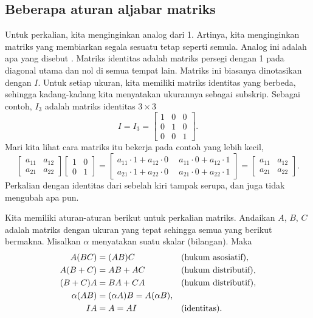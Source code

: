\subsection{Beberapa aturan aljabar matriks}

Untuk perkalian, kita menginginkan analog dari 1. Artinya,
kita menginginkan matriks yang membiarkan segala sesuatu tetap seperti semula.
Analog ini adalah apa yang disebut
\emph{}.
Matriks identitas adalah matriks persegi dengan 1 pada
diagonal utama dan nol di semua tempat lain. Matriks ini biasanya dinotasikan dengan $I$.
Untuk setiap ukuran, kita memiliki matriks identitas yang berbeda, sehingga kadang-kadang kita menyatakan
ukurannya sebagai subskrip. Sebagai contoh, $I_3$ adalah matriks identitas
$3 \times 3$
\begin{equation*}
I = I_3 =
\begin{bmatrix}
1 & 0 & 0 \\
0 & 1 & 0 \\
0 & 0 & 1
\end{bmatrix} .
\end{equation*}
Mari kita lihat cara matriks itu bekerja pada contoh yang lebih kecil,
\begin{equation*}
\begin{bmatrix}
a_{11} & a_{12} \\
a_{21} & a_{22}
\end{bmatrix}
\begin{bmatrix}
1 & 0 \\
0 & 1
\end{bmatrix} =
\begin{bmatrix}
a_{11} \cdot 1 + a_{12} \cdot 0
& ~~
a_{11} \cdot 0 + a_{12} \cdot 1
\\
a_{21} \cdot 1 + a_{22} \cdot 0
& ~~
a_{21} \cdot 0 + a_{22} \cdot 1
\end{bmatrix}
=
\begin{bmatrix}
a_{11} & a_{12} \\
a_{21} & a_{22}
\end{bmatrix} .
\end{equation*}
Perkalian dengan identitas dari sebelah kiri tampak serupa, dan juga
tidak mengubah apa pun.

\medskip

Kita memiliki aturan-aturan berikut untuk perkalian matriks. Andaikan
$A$, $B$, $C$ adalah matriks dengan ukuran yang tepat sehingga semua yang berikut
bermakna. Misalkan $\alpha$ menyatakan suatu skalar (bilangan). Maka
\begin{align*}
A(BC) & = (AB)C & & \text{(\myindex{hukum asosiatif})} , \\
A(B+C) & = AB + AC & & \text{(\myindex{hukum distributif})} , \\
(B+C)A & = BA + CA & & \text{(hukum distributif)} , \\
\alpha(AB) & = (\alpha A)B = A(\alpha B) , & &  \\
IA & = A = AI & & \text{(identitas)}.
\end{align*}

